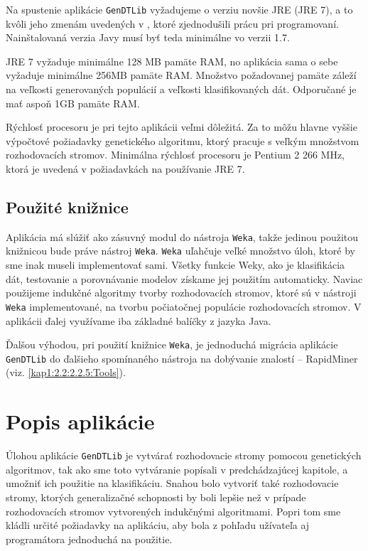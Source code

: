 Na spustenie aplikácie \verb|GenDTLib| vyžadujeme o verziu novšie JRE (JRE 7), a to kvôli jeho zmenám uvedených v \cite{online-java}, ktoré zjednodušili prácu pri programovaní. Nainštalovaná verzia Javy musí byť teda minimálne vo verzii 1.7. 

JRE 7 vyžaduje minimálne 128 MB pamäte RAM, no aplikácia sama o sebe vyžaduje minimálne 256MB pamäte RAM. Množstvo požadovanej pamäte záleží na veľkosti generovaných populácií a veľkosti klasifikovaných dát. Odporučané je mať aspoň 1GB pamäte RAM.

Rýchlosť procesoru je pri tejto aplikácii veľmi dôležitá. Za to môžu hlavne vyššie výpočtové požiadavky genetického algoritmu, ktorý pracuje s veľkým množstvom rozhodovacích stromov. Minimálna rýchlosť procesoru je Pentium 2 266 MHz, ktorá je uvedená v požiadavkách na používanie JRE 7.
\subsection{Použité knižnice}\label{kap4:4.1:4.1.4:Libs}
Aplikácia má slúžiť ako zásuvný modul do nástroja \verb|Weka|, takže jedinou použitou knižnicou bude práve nástroj \verb|Weka|. \verb|Weka| uľahčuje veľké množstvo úloh, ktoré by sme inak museli implementovať sami. Všetky funkcie Weky, ako je klasifikácia dát, testovanie a porovnávanie modelov získame jej použitím automaticky. Naviac použijeme indukčné algoritmy tvorby rozhodovacích stromov, ktoré sú v nástroji \verb|Weka| implementované, na tvorbu počiatočnej populácie rozhodovacích stromov. V aplikácii ďalej využívame iba základné balíčky z jazyka Java. 

Ďalšou výhodou, pri použití knižnice \verb|Weka|, je jednoduchá migrácia aplikácie \verb|GenDTLib| do ďalšieho spomínaného nástroja na dobývanie znalostí -- RapidMiner (viz. \ref{kap1:2.2:2.2.5:Tools}).

\section{Popis aplikácie}\label{kap4:4.2:About}
Úlohou aplikácie \verb|GenDTLib| je vytvárať rozhodovacie stromy pomocou genetických algoritmov, tak ako sme toto vytváranie popísali v predchádzajúcej kapitole, a umožniť ich použitie na klasifikáciu. Snahou bolo vytvoriť také rozhodovacie stromy, ktorých generalizačné schopnosti by boli lepšie než v prípade rozhodovacích stromov vytvorených indukčnými algoritmami. Popri tom sme kládli určité požiadavky na aplikáciu, aby bola z pohľadu užívateľa aj programátora jednoduchá na použitie.

